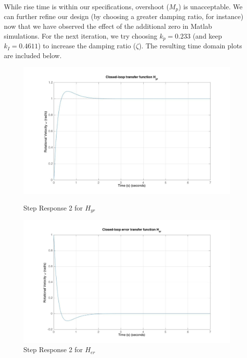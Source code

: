 \documentclass[11pt,titlepage]{article}
\begin{document}
	While rise time is within our specifications, overshoot ($M_p$) is unacceptable. We can further refine our design (by choosing a greater damping ratio, for instance) now that we have observed the effect of the additional zero in Matlab simulations. For the next iteration, we try choosing $k_p=0.233$ (and keep $k_I=0.4611$) to increase the damping ratio ($\zeta$). The resulting time domain plots are included below.
	
     \begin{figure}[H]
        \centering
        \begin{minipage}{.5\textwidth}
            \centering
            \includegraphics[scale=.18]{Hyr_step2_mat}
            \caption{Step Response 2 for $H_{yr}$}
            \label{fig:Hyr_step2_mat}
        \end{minipage}%
        \begin{minipage}{.5\textwidth}
            \centering
            \includegraphics[scale=.18]{Her_step2_mat}
            \caption{Step Response 2 for $H_{er}$}
            \label{fig:Her_step2_mat}
        \end{minipage}%
    \end{figure}
\end{document}
